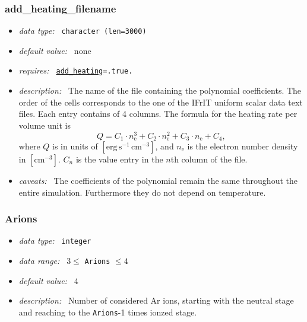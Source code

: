 \documentclass[a4paper,10pt]{article}
\begin{document}
\subsubsection{add\_heating\_filename}
\label{opt:addheatingfilename}
\begin{itemize}
 \item \textit{data type:~} \texttt{character (len=3000)}
 \item \textit{default value:~} none
 \item \textit{requires:~} 
  \texttt{\hyperref[opt:addheating]{add\_heating}=.true.}
 \item \textit{description:~} The name of the file containing the polynomial
  coefficients. The order of the cells corresponds to the one of the IFrIT
  uniform scalar data text files.
  Each entry contains of 4 columns.
  The formula for the heating rate per volume unit is
  \begin{equation}
  Q=  C_1 \cdot n_\mathrm{e}^3 +C_2 \cdot n_\mathrm{e}^2 +C_3 \cdot n_\mathrm{e}
     +C_4, 
  \end{equation}
  where $Q$ is in units of $\mathrm{\left[erg\,s^{-1}\,cm^{-3}\right]}$,
  and $n_\mathrm{e}$ is the electron number density in 
  $\mathrm{\left[cm^{-3}\right]}$. $C_n$ is the value entry in the $n$th column
  of the file.
 \item \textit{caveats:~} The coefficients of the polynomial remain the same
  throughout the entire simulation. Furthermore they do not depend on 
  temperature.
\end{itemize}

\subsubsection{Arions}
\label{opt:arions}
\begin{itemize}
 \item \textit{data type:~} \texttt{integer}
 \item \textit{data range:~}  $3 \leq$ \texttt{Arions} $\leq 4$ 
 \item \textit{default value:~} 4
 \item \textit{description:~} Number of considered Ar ions, starting with the 
 neutral stage and reaching to  the \texttt{Arions}-1 times ionzed stage.
\end{itemize}
\end{document}
